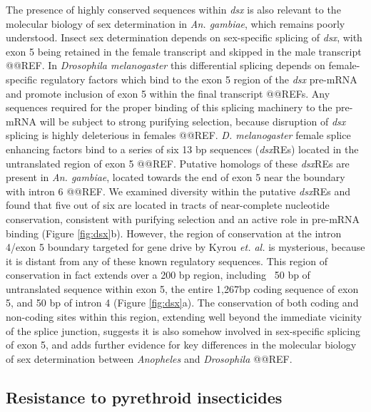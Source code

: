 \documentclass[a4paper,11pt,abstracton,hidelinks]{scrartcl}
\begin{document}
The presence of highly conserved sequences within \textit{dsx} is also relevant to the molecular biology of sex determination in \textit{An. gambiae}, which remains poorly understood.
%
Insect sex determination depends on sex-specific splicing of \textit{dsx}, with exon 5 being retained in the female transcript and skipped in the male transcript @@REF.
%
In \textit{Drosophila melanogaster} this differential splicing depends on female-specific regulatory factors which bind to the exon 5 region of the \textit{dsx} pre-mRNA and promote inclusion of exon 5 within the final transcript @@REFs.
%
Any sequences required for the proper binding of this splicing machinery to the pre-mRNA will be subject to strong purifying selection, because disruption of \textit{dsx} splicing is highly deleterious in females @@REF. 
%
\textit{D. melanogaster} female splice enhancing factors bind to a series of six 13 bp sequences (\textit{dsx}REs) located in the untranslated region of exon 5 @@REF.
%
Putative homologs of these \textit{dsx}REs are present in \textit{An. gambiae},  located towards the end of exon 5 near the boundary with intron 6 @@REF.
%
We examined diversity within the putative \textit{dsx}REs and found that five out of six are located in tracts of near-complete nucleotide conservation, consistent with purifying selection and an active role in pre-mRNA binding (Figure \ref{fig:dsx}b).
%
However, the region of conservation at the intron 4/exon 5 boundary targeted for gene drive by Kyrou \textit{et. al.} \cite{kyrou2018} is mysterious, because it is distant from any of these known regulatory sequences.
%
This region of conservation in fact extends over a 200 bp region, including ~50 bp of untranslated sequence within exon 5, the entire 1,267bp coding sequence of exon 5, and 50 bp of intron 4 (Figure \ref{fig:dsx}a).
%
The conservation of both coding and non-coding sites within this region, extending well beyond the immediate vicinity of the splice junction, suggests it is also somehow involved in sex-specific splicing of exon 5, and adds further evidence for key differences in the molecular biology of sex determination between \textit{Anopheles} and \textit{Drosophila} @@REF. 
%


\subsection*{Resistance to pyrethroid insecticides}
\end{document}
